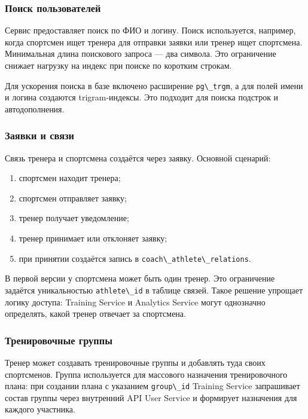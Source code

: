 \subsubsection{Поиск пользователей}

Сервис предоставляет поиск по ФИО и логину. Поиск используется, например, когда спортсмен ищет тренера для отправки заявки или тренер ищет спортсмена. Минимальная длина поискового запроса --- два символа. Это ограничение снижает нагрузку на индекс при поиске по коротким строкам.

Для ускорения поиска в базе включено расширение \passthrough{\lstinline!pg\_trgm!}, а для полей имени и логина создаются trigram-индексы. Это подходит для поиска подстрок и автодополнения.

\subsubsection{Заявки и связи}

Связь тренера и спортсмена создаётся через заявку. Основной сценарий:

\begin{enumerate}
\def\labelenumi{\arabic{enumi}.}
\tightlist
\item
  спортсмен находит тренера;
\item
  спортсмен отправляет заявку;
\item
  тренер получает уведомление;
\item
  тренер принимает или отклоняет заявку;
\item
  при принятии создаётся запись в \passthrough{\lstinline!coach\_athlete\_relations!}.
\end{enumerate}

В первой версии у спортсмена может быть один тренер. Это ограничение задаётся уникальностью \passthrough{\lstinline!athlete\_id!} в таблице связей. Такое решение упрощает логику доступа: Training Service и Analytics Service могут однозначно определять, какой тренер отвечает за спортсмена.

\subsubsection{Тренировочные группы}

Тренер может создавать тренировочные группы и добавлять туда своих спортсменов. Группа используется для массового назначения тренировочного плана: при создании плана с указанием \passthrough{\lstinline!group\_id!} Training Service запрашивает состав группы через внутренний API User Service и формирует назначения для каждого участника.

